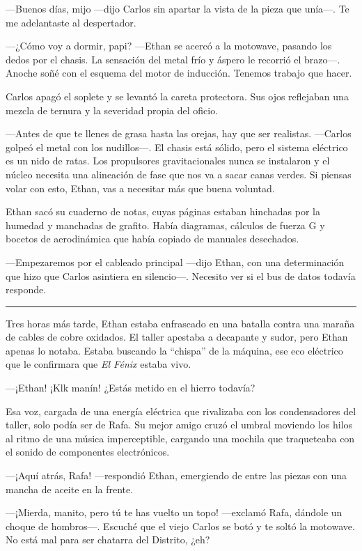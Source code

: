 \documentclass[12pt,a4paper]{book}
\begin{document}
---Buenos días, mijo ---dijo Carlos sin apartar la vista de la pieza que unía---. Te me adelantaste al despertador.

---¿Cómo voy a dormir, papi? ---Ethan se acercó a la motowave, pasando los dedos por el chasis. La sensación del metal frío y áspero le recorrió el brazo---. Anoche soñé con el esquema del motor de inducción. Tenemos trabajo que hacer.

Carlos apagó el soplete y se levantó la careta protectora. Sus ojos reflejaban una mezcla de ternura y la severidad propia del oficio.

---Antes de que te llenes de grasa hasta las orejas, hay que ser realistas. ---Carlos golpeó el metal con los nudillos---. El chasis está sólido, pero el sistema eléctrico es un nido de ratas. Los propulsores gravitacionales nunca se instalaron y el núcleo necesita una alineación de fase que nos va a sacar canas verdes. Si piensas volar con esto, Ethan, vas a necesitar más que buena voluntad.

Ethan sacó su cuaderno de notas, cuyas páginas estaban hinchadas por la humedad y manchadas de grafito. Había diagramas, cálculos de fuerza G y bocetos de aerodinámica que había copiado de manuales desechados.

---Empezaremos por el cableado principal ---dijo Ethan, con una determinación que hizo que Carlos asintiera en silencio---. Necesito ver si el bus de datos todavía responde.

\bigskip
\noindent\rule{\textwidth}{0.4pt}
\bigskip

Tres horas más tarde, Ethan estaba enfrascado en una batalla contra una maraña de cables de cobre oxidados. El taller apestaba a decapante y sudor, pero Ethan apenas lo notaba. Estaba buscando la ``chispa'' de la máquina, ese eco eléctrico que le confirmara que \textit{El Fénix} estaba vivo.

---¡Ethan! ¡Klk manín! ¿Estás metido en el hierro todavía?

Esa voz, cargada de una energía eléctrica que rivalizaba con los condensadores del taller, solo podía ser de Rafa. Su mejor amigo cruzó el umbral moviendo los hilos al ritmo de una música imperceptible, cargando una mochila que traqueteaba con el sonido de componentes electrónicos.

---¡Aquí atrás, Rafa! ---respondió Ethan, emergiendo de entre las piezas con una mancha de aceite en la frente.

---¡Mierda, manito, pero tú te has vuelto un topo! ---exclamó Rafa, dándole un choque de hombros---. Escuché que el viejo Carlos se botó y te soltó la motowave. No está mal para ser chatarra del Distrito, ¿eh?
\end{document}
